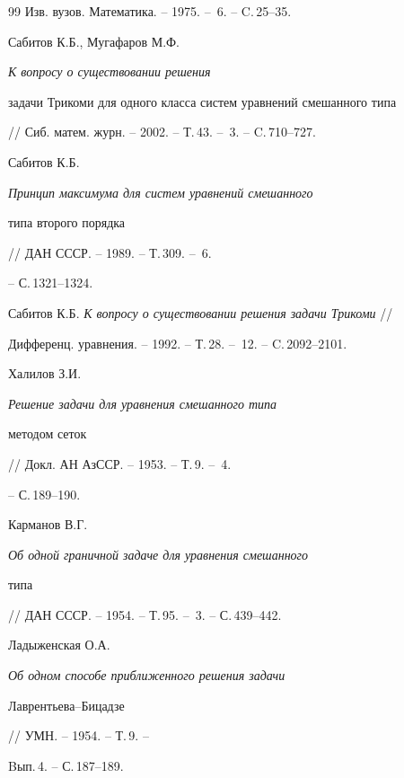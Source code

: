 \begin{thebibliography}{99}
Изв. вузов. Математика. -- 1975. -- \No\,6. -- C.\,25--35.







Сабитов К.Б., Мугафаров М.Ф. {\em К вопросу о существовании решения


задачи Трикоми для одного класса систем уравнений смешанного типа}


// Сиб. матем. журн. -- 2002. -- Т.\,43. -- \No\,3. -- C.\,710--727.







Сабитов К.Б. {\em Принцип максимума для систем уравнений смешанного


типа второго порядка} // ДАН СССР. -- 1989. -- Т.\,309. -- \No\,6.


-- С.\,1321--1324.







Сабитов К.Б. {\em К вопросу о существовании решения задачи Трикоми} //


Дифференц. уравнения. -- 1992. -- Т.\,28. -- \No\,12. -- C.\,2092--2101.







Халилов З.И. {\em Решение задачи для уравнения смешанного типа


методом сеток} // Докл. АН АзССР. -- 1953. -- Т.\,9. -- \No\,4.


-- С.\,189--190.







Карманов В.Г. {\em Об одной граничной задаче для уравнения смешанного


типа} // ДАН СССР. -- 1954. -- Т.\,95. -- \No\,3. -- С.\,439--442.







Ладыженская О.А. {\em Об одном способе приближенного решения задачи


Лаврентьева--Бицадзе} // УМН. -- 1954. -- Т.\,9. -- 


Bып.\,4. -- С.\,187--189.






\end{thebibliography}
